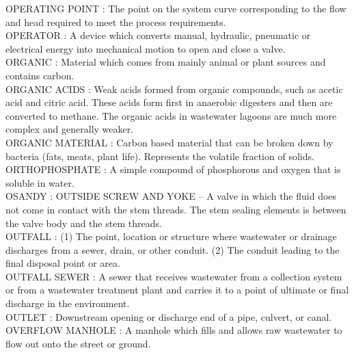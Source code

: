 \vspace{0.15cm}
OPERATING POINT :   The point on the system curve corresponding to the flow and head required to meet the process requirements.\\
\vspace{0.15cm}
OPERATOR :   A device which converts manual, hydraulic, pneumatic or electrical energy into mechanical motion to open and close a valve.\\
\vspace{0.15cm}
ORGANIC :  Material which comes from mainly animal or plant sources and contains carbon. \\
\vspace{0.15cm}
ORGANIC ACIDS :  Weak acids formed from organic compounds, such as acetic acid and citric acid. These acids form first in anaerobic digesters and then are converted to methane. The organic acids in wastewater lagoons are much more complex and generally weaker.\\
\vspace{0.15cm}
ORGANIC MATERIAL :   Carbon based material that can be broken down by bacteria (fats, meats, plant life).  Represents the volatile fraction of solids.\\
\vspace{0.15cm}
ORTHOPHOSPHATE :   A simple compound of phosphorous and oxygen that is soluble in water.\\
\vspace{0.15cm}
OSANDY :  OUTSIDE SCREW AND YOKE –  A valve in which the fluid does not come in contact with the stem threads. The stem sealing elements is between the valve body and the stem threads.\\
\vspace{0.15cm}
OUTFALL :  (1) The point, location or structure where wastewater or drainage discharges from a sewer, drain, or other conduit. (2) The conduit leading to the final disposal point or area. \\
\vspace{0.15cm}
OUTFALL SEWER :  A sewer that receives wastewater from a collection system or from a wastewater treatment plant and carries it to a point of ultimate or final discharge in the environment. \\
\vspace{0.15cm}
OUTLET :  Downstream opening or discharge end of a pipe, culvert, or canal. \\
\vspace{0.15cm}
OVERFLOW MANHOLE :  A manhole which fills and allows raw wastewater to flow out onto the street or ground. \\
